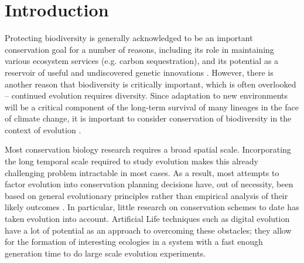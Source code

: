 \documentclass[letterpaper]{article}
\begin{document}
\begin{abstract}
%
%
%
%
\end{abstract}

\section{Introduction}

Protecting biodiversity is generally acknowledged to be an important conservation goal for a number of reasons, including its role in maintaining various ecosystem services (e.g. carbon sequestration), and its potential as a reservoir of useful and undiscovered genetic innovations \citep{gaston_biodiversity:_2004,hassan_ecosystems_2005,loreau_biodiversity_2001,montoya_emerging_2012}. However, there is another reason that biodiversity is critically important, which is often overlooked -- continued evolution requires diversity. Since adaptation to new environments will be a critical component of the long-term survival of many lineages in the face of climate change, it is important to consider conservation of biodiversity in the context of evolution \citep{cowling_rapid_2001,mace_evolutionary_2008,smith_prescriptive_2014}. 

	Most conservation biology research requires a broad spatial scale. Incorporating the long temporal scale required to study evolution makes this already challenging problem intractable in most cases. As a result, most attempts to factor evolution into conservation planning decisions have, out of necessity, been based on general evolutionary principles rather than empirical analysis of their likely outcomes  \citep{cowling_rapid_2001, sgro_building_2011, ferriere_evolutionary_2004}. In particular, little research on conservation schemes to date has taken evolution into account. Artificial Life techniques such as digital evolution have a lot of potential as an approach to overcoming these obstacles; they allow for the formation of interesting ecologies in a system with a fast enough generation time to do large scale evolution experiments.
    
\end{document}
